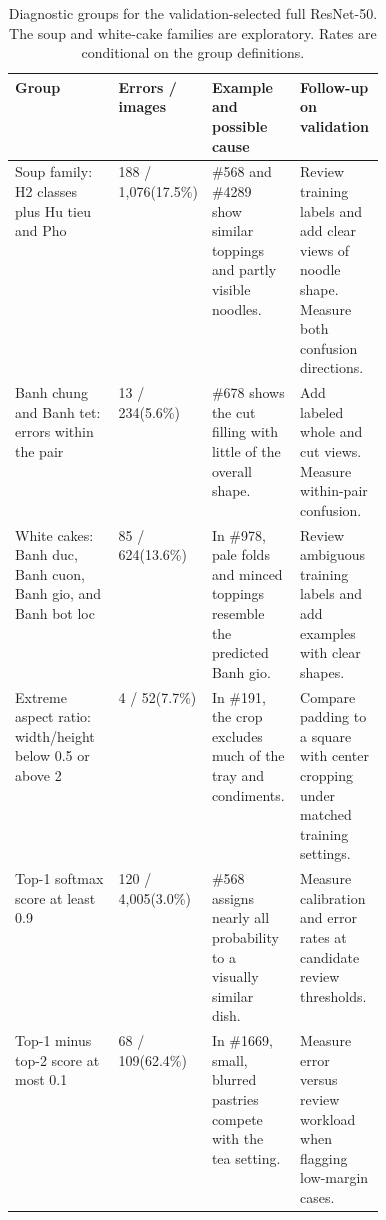 \begin{table}[H]
  \centering
  \caption{Diagnostic groups for the validation-selected full ResNet-50. The soup and white-cake families are exploratory. Rates are conditional on the group definitions.}
  \label{tab:a2-error-groups}
  \small
  \setlength{\tabcolsep}{4pt}
  \begin{tabularx}{\linewidth}{@{}>{\raggedright\arraybackslash}p{0.28\linewidth} p{0.15\linewidth} Y Y@{}}
    \toprule
    Group & Errors / images & Example and possible cause & Follow-up on validation \\
    \midrule
    Soup family: H2 classes plus Hu tieu and Pho
      & 188 / 1,076\newline (17.5\%)
      & \#568 and \#4289 show similar toppings and partly visible noodles.
      & Review training labels and add clear views of noodle shape. Measure both confusion directions. \\
    \addlinespace
    Banh chung and Banh tet: errors within the pair
      & 13 / 234\newline (5.6\%)
      & \#678 shows the cut filling with little of the overall shape.
      & Add labeled whole and cut views. Measure within-pair confusion. \\
    \addlinespace
    White cakes: Banh duc, Banh cuon, Banh gio, and Banh bot loc
      & 85 / 624\newline (13.6\%)
      & In \#978, pale folds and minced toppings resemble the predicted Banh gio.
      & Review ambiguous training labels and add examples with clear shapes. \\
    \addlinespace
    Extreme aspect ratio: width/height below 0.5 or above 2
      & 4 / 52\newline (7.7\%)
      & In \#191, the crop excludes much of the tray and condiments.
      & Compare padding to a square with center cropping under matched training settings. \\
    \addlinespace
    Top-1 softmax score at least 0.9
      & 120 / 4,005\newline (3.0\%)
      & \#568 assigns nearly all probability to a visually similar dish.
      & Measure calibration and error rates at candidate review thresholds. \\
    \addlinespace
    Top-1 minus top-2 score at most 0.1
      & 68 / 109\newline (62.4\%)
      & In \#1669, small, blurred pastries compete with the tea setting.
      & Measure error versus review workload when flagging low-margin cases. \\
    \bottomrule
  \end{tabularx}
\end{table}

